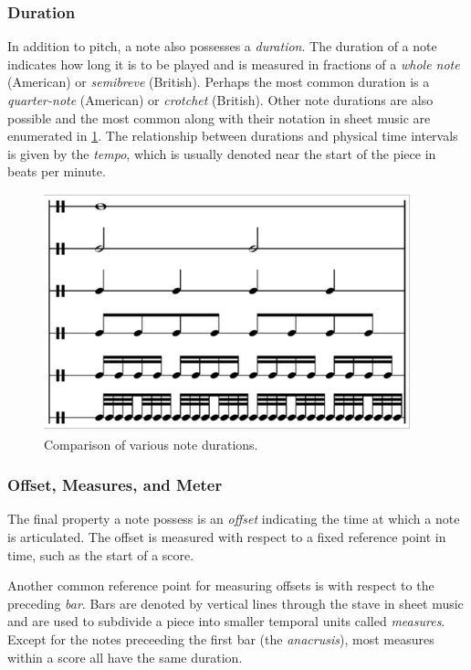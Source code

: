 \subsubsection{Duration}

In addition to pitch, a note also possesses a \emph{duration}. The duration of
a note indicates how long it is to be played and is measured in fractions of a
\emph{whole note} (American) or \emph{semibreve} (British). Perhaps the most
common duration is a \emph{quarter-note} (American) or \emph{crotchet}
(British). Other note durations are also possible and the most common along
with their notation in sheet music are enumerated in
\cref{fig:note-durations}. The relationship between durations and
physical time intervals is given by the \emph{tempo}, which is usually
denoted near the start of the piece in beats per minute.

\begin{figure}[tb]
    \centering
    \includegraphics[width=0.6\linewidth]{note-durations.png}
    \caption{Comparison of various note durations.}
    \label{fig:note-durations}
\end{figure}

\subsubsection{Offset, Measures, and Meter}

The final property a note possess is an \emph{offset} indicating the time at
which a note is articulated. The offset is measured with respect to a fixed
reference point in time, such as the start of a score.

Another common reference point for measuring offsets is with respect to the
preceding \emph{bar}. Bars are denoted by vertical lines through the
stave in sheet music and are used to subdivide a piece into smaller temporal
units called \emph{measures}. Except for the notes preceeding the first bar
(\ie the \emph{anacrusis}), most measures within a score all have the same
duration.

